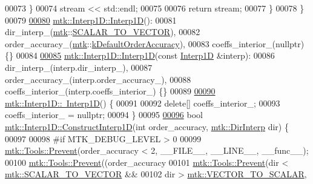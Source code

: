 \begin{DoxyCode}
00073   \}
00074   stream << std::endl;
00075 
00076   \textcolor{keywordflow}{return} stream;
00077 \}
00078 \}
00079 
\hypertarget{mtk__interp__1d_8cc_source_l00080}{}\hyperlink{classmtk_1_1Interp1D_ae56f90c53579c91c1dbe715f7e7361be}{00080} \hyperlink{classmtk_1_1Interp1D_ae56f90c53579c91c1dbe715f7e7361be}{mtk::Interp1D::Interp1D}():
00081   dir\_interp\_(\hyperlink{namespacemtk}{mtk}::\hyperlink{namespacemtk_ga674ec67bd1baa04e5dc06c2bcc351972abc9e2b8cd5a497c9f3252a792e356139}{SCALAR\_TO\_VECTOR}),
00082   order\_accuracy\_(\hyperlink{namespacemtk}{mtk}::\hyperlink{group__c01-roots_ga0d95560098eb36420511103637b6952f}{kDefaultOrderAccuracy}),
00083   coeffs\_interior\_(nullptr) \{\}
00084 
\hypertarget{mtk__interp__1d_8cc_source_l00085}{}\hyperlink{classmtk_1_1Interp1D_a92a5ed77144b3824d201a586f4072fd0}{00085} \hyperlink{classmtk_1_1Interp1D_ae56f90c53579c91c1dbe715f7e7361be}{mtk::Interp1D::Interp1D}(\textcolor{keyword}{const} \hyperlink{classmtk_1_1Interp1D}{Interp1D} &interp):
00086   dir\_interp\_(interp.dir\_interp\_),
00087   order\_accuracy\_(interp.order\_accuracy\_),
00088   coeffs\_interior\_(interp.coeffs\_interior\_) \{\}
00089 
\hypertarget{mtk__interp__1d_8cc_source_l00090}{}\hyperlink{classmtk_1_1Interp1D_a52ea06b5e3d7082eb06ade256f4e30fb}{00090} \hyperlink{classmtk_1_1Interp1D_a52ea06b5e3d7082eb06ade256f4e30fb}{mtk::Interp1D::~Interp1D}() \{
00091 
00092   \textcolor{keyword}{delete}[] coeffs\_interior\_;
00093   coeffs\_interior\_ = \textcolor{keyword}{nullptr};
00094 \}
00095 
\hypertarget{mtk__interp__1d_8cc_source_l00096}{}\hyperlink{classmtk_1_1Interp1D_ab1c8e12534886aa185b24be474d1056e}{00096} \textcolor{keywordtype}{bool} \hyperlink{classmtk_1_1Interp1D_ab1c8e12534886aa185b24be474d1056e}{mtk::Interp1D::ConstructInterp1D}(\textcolor{keywordtype}{int} order\_accuracy, 
      \hyperlink{group__c02-enums_ga674ec67bd1baa04e5dc06c2bcc351972}{mtk::DirInterp} dir) \{
00097 
00098 \textcolor{preprocessor}{  #if MTK\_DEBUG\_LEVEL > 0}
00099   \hyperlink{classmtk_1_1Tools_a332324c6f25e66be9dff48c5987a3b9f}{mtk::Tools::Prevent}(order\_accuracy < 2, \_\_FILE\_\_, \_\_LINE\_\_, \_\_func\_\_);
00100   \hyperlink{classmtk_1_1Tools_a332324c6f25e66be9dff48c5987a3b9f}{mtk::Tools::Prevent}((order\_accuracy%
00101   \hyperlink{classmtk_1_1Tools_a332324c6f25e66be9dff48c5987a3b9f}{mtk::Tools::Prevent}(dir < \hyperlink{namespacemtk_ga674ec67bd1baa04e5dc06c2bcc351972abc9e2b8cd5a497c9f3252a792e356139}{mtk::SCALAR\_TO\_VECTOR} &&
00102                       dir > \hyperlink{namespacemtk_ga674ec67bd1baa04e5dc06c2bcc351972a122cf2e24aef105e9214698206af6904}{mtk::VECTOR\_TO\_SCALAR},

\end{DoxyCode}
